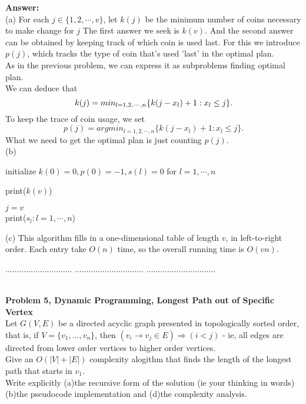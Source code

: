 \documentclass{article}
\begin{document}
\noindent
{\bf Answer:}\\



\noindent(a) For each $j\in\{1,2,\cdots,v\}$, let $k(j)$ be the minimum number of coins necessary to make change for $j$
The first answer we seek is $k(v)$. And the second answer can be obtained by keeping track of which coin is used last. For this we introduce $p(j)$, which tracks the type of coin that's used 'last' in the optimal plan.\\
As in the previous problem, we can express it as subproblems finding optimal plan.\\
We can deduce that 
\[ 
k(j)=min_{l=1,2,\cdots,n}\{k(j-x_l)+1: x_l\leq j\}.\\
\]
To keep the trace of coin usage, we set 
\[p(j)=argmin_{l=1,2,\cdots,n}\{k(j-x_l)+1 : x_l\leq j\}.\]
What we need to get the optimal plan is just counting $p(j)$.\\
\noindent(b) \\
\begin{algorithm}[H]
	initialize $k(0) = 0, p(0)=-1, s(l)=0$ for $l=1,\cdots,n$ \\

	print($k(v)$)
	
	$j=v$\\
	print($s_l:l=1,\cdots,n$)
\end{algorithm} 

\noindent(c)
This algorithm fills in a one-dimensional table of length $v$, in left-to-right order. Each entry take $O(n)$ time, so the overall running time is $O(vn)$.

\pagebreak
\noindent{\bf  } $.............................$
\noindent{\bf } $..............................$
\noindent{\bf }          $..............................$

\noindent
{}\\

\noindent
{\bf Problem 5, Dynamic Programming, Longest Path out of Specific Vertex }\\
Let $G(V,E)$ be a directed acyclic graph presented in topologically sorted order, that is, 
if $V=\{ v_1 , \ldots , v_n \}$, then $(v_i \rightarrow v_j \in E) \Rightarrow ( i < j )$ -
ie, all edges are directed from lower order vertices to higher order vertices.\\
Give an $O(|V|+|E|)$ complexity alogithm that finds the length of the longest path that starts in $v_1$.\\
Write explicitly (a)the recursive form of the solution (ie your thinking in words) (b)the pseudocode implementation and 
(d)the complexity analysis. \\
\end{document}

